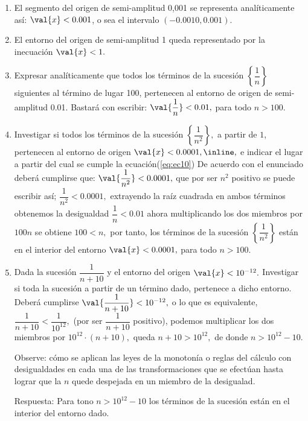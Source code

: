 \begin{ejemplos}\label{ej:ejem1}
\begin{enumerate}
\item El segmento del origen de semi-amplitud 0,001 se representa analíticamente
así: $\val{x}<0.001$, o sea el intervalo $\left(-0.0010,0.001\right)$.
\item El entorno del origen de semi-amplitud 1 queda representado por la
inecuación $\val{x}<1.$
\item \begin{flushleft}
\label{itm:ej27}Expresar analíticamente que todos los términos de
la sucesión $\left\{ \dfrac{1}{n}\right\} $ siguientes al término
de lugar 100, pertenecen al entorno de origen de semi-amplitud 0.01.\linebreak{}
\sol Bastará con escribir: $\val{\dfrac{1}{n}}<0.01,$ para todo
$n>100.$ \fin
\par\end{flushleft}
\item Investigar si todos los términos de la sucesión $\left\{ \dfrac{1}{n^{2}}\right\} ,$
a partir de $1$, pertenecen al entorno de origen $\val{x}<0.0001,\inline\text{\label{eq:ec10}},$
e indicar el lugar a partir del cual se cumple la ecuación(\foreignlanguage{english}{\ref{eq:ec10}})
\linebreak{}
\sol De acuerdo con el enunciado deberá cumplirse que: $\val{\dfrac{1}{n^{2}}}<0.0001,$
que por ser $n^{2}$ positivo se puede escribir así; $\dfrac{1}{n^{2}}<0.0001,$
extrayendo la raíz cuadrada en ambos términos obtenemos la desigualdad
$\dfrac{1}{n}<0.01$ ahora multiplicando los dos miembros por $100n$
se obtiene $100<n,$ por tanto, los términos de la sucesión $\left\{ \dfrac{1}{n^{2}}\right\} $
están en el interior del entorno $\val{x}<0.0001,$ para todo $n>100.$
\fin
\item \begin{flushleft}
Dada la sucesión $\dfrac{1}{n+10}$ y el entorno del origen $\val{x}<10^{-12}.$
Investigar si toda la sucesión a partir de un término dado, pertenece
a dicho entorno.\linebreak{}
\sol Deberá cumplirse $\val{\dfrac{1}{n+10}}<10^{-12},$ o lo que
es equivalente, $\dfrac{1}{n+10}<\dfrac{1}{10^{12}},$ (por ser $\dfrac{1}{n+10}$
positivo), podemos multiplicar los dos miembros por $10^{12}\cdot(n+10),$
queda $n+10>10^{12},$ de donde $n>10^{12}-10$.\linebreak{}
\vspace*{2pt}\begin{nota}\peque Observe: cómo se aplican las leyes
de la monotonía o reglas del cálculo con desigualdades en cada una
de las transformaciones que se efectúan hasta lograr que la $n$ quede
despejada en un miembro de la desigualad. \end{nota}Respuesta: Para
tono $n>10^{12}-10$ los términos de la sucesión están en el interior
del entorno dado.\fin
\par\end{flushleft}

\end{enumerate}
\end{ejemplos}

